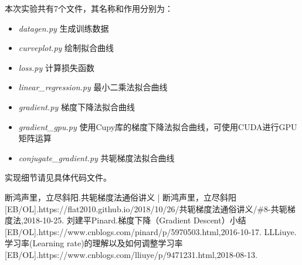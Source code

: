 \documentclass[a4paper,11pt,UTF8]{ctexart}
\begin{document}
本次实验共有7个文件，其名称和作用分别为：
\begin{itemize}
	\item \emph{datagen.py} \quad 生成训练数据
	\item \emph{curveplot.py} \quad 绘制拟合曲线
	\item \emph{loss.py} \quad 计算损失函数
	\item \emph{linear\_regression.py} \quad 最小二乘法拟合曲线
	\item \emph{gradient.py} \quad 梯度下降法拟合曲线
	\item \emph{gradient\_gpu.py} \quad 使用Cupy库的梯度下降法拟合曲线，可使用CUDA进行GPU矩阵运算
	\item \emph{conjugate\_gradient.py} \quad 共轭梯度法拟合曲线
\end{itemize}
\par
实现细节请见具体代码文件。	

\begin{thebibliography}{99} 
断鸿声里，立尽斜阳.共轭梯度法通俗讲义 | 断鸿声里，立尽斜阳[EB/OL].https://flat2010.github.io/2018/10/26/共轭梯度法通俗讲义/\#8-共轭梯度法,2018-10-25.
刘建平Pinard.梯度下降（Gradient Descent）小结[EB/OL].https://www.cnblogs.com/pinard/p/5970503.html,2016-10-17.
LLLiuye.学习率(Learning rate)的理解以及如何调整学习率[EB/OL].https://www.cnblogs.com/lliuye/p/9471231.html,2018-08-13.
\end{thebibliography}

\end{document}
